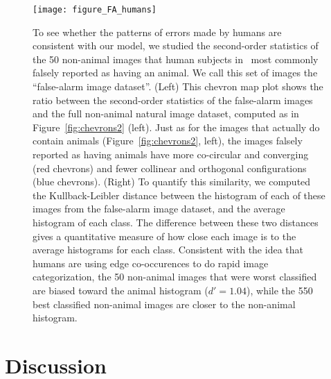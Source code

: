 \documentclass{article}%
\begin{document}
\begin{figure}%
\centering%
\texttt{[image: figure\_FA\_humans]}%
\caption{%
  To see whether the patterns of errors made by humans are consistent
  with our model, we studied the second-order statistics of the 50
  non-animal images that human subjects in~\citet{Serre07} most
  commonly falsely reported as having an animal. We call this set of
  images the ``false-alarm image dataset''.  (Left) This chevron map
  plot shows the ratio between the second-order statistics of the
  false-alarm images and the full non-animal natural image dataset,
  computed as in Figure~\ref{fig:chevrons2} (left).  Just as for the
  images that actually do contain animals (Figure~\ref{fig:chevrons2},
  left), the images falsely reported as having animals have more
  co-circular and converging (red chevrons) and fewer collinear and
  orthogonal configurations (blue chevrons).  (Right) To quantify this
  similarity, we computed the Kullback-Leibler distance between the
  histogram of each of these images from the false-alarm image
  dataset, and the average histogram of each class. The difference
  between these two distances gives a quantitative measure of how
  close each image is to the average histograms for each class.
  Consistent with the idea that humans are using edge co-occurences to
  do rapid image categorization, the 50 non-animal images that were
  worst classified are biased toward the animal histogram ($d' = 1.04$),
  while the 550 best classified non-animal images are closer to the
  non-animal histogram.
\label{fig:false-alarms}}%
\end{figure}%
\section*{Discussion} 
\end{document}
